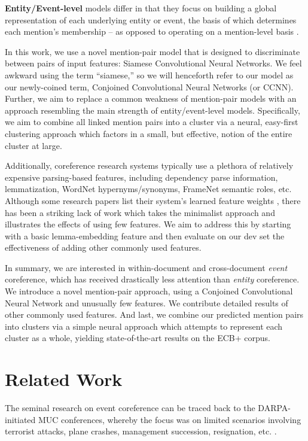 \documentclass[11pt,a4paper]{article}
\begin{document}
\textbf{Entity/Event-level} models differ in that they focus on building a global representation of each underlying entity or event, the basis of which determines each mention's membership -- as opposed to operating on a mention-level basis \cite{DBLP:journals/corr/WisemanRS16,clark2016improving}.

In this work, we use a novel mention-pair model that is designed to discriminate between pairs of input features: Siamese Convolutional Neural Networks.  We feel awkward using the term ``siamese,'' so we will henceforth refer to our model as our newly-coined term, Conjoined Convolutional Neural Networks (or CCNN).  Further, we aim to replace a common weakness of mention-pair models with an approach resembling the main strength of entity/event-level models. Specifically, we aim to combine all linked mention pairs into a cluster via a neural, easy-first clustering approach which factors in a small, but effective, notion of the entire cluster at large.

Additionally, coreference research systems typically use a plethora of relatively expensive parsing-based features, including dependency parse information, lemmatization, WordNet hypernyms/synonyms, FrameNet semantic roles, etc.  Although some research papers list their system's learned feature weights \cite{journals/tacl/YangCF15}, there has been a striking lack of work which takes the minimalist approach and illustrates the effects of using few features.  We aim to address this by starting with a basic lemma-embedding feature and then evaluate on our dev set the effectiveness of adding other commonly used features.

In summary, we are interested in within-document and cross-document \textit{event} coreference, which has received drastically less attention than \textit{entity} coreference. We introduce a novel mention-pair approach, using a Conjoined Convolutional Neural Network and unusually few features.  We contribute detailed results of other commonly used features.  And last, we combine our predicted mention pairs into clusters via a simple neural approach which attempts to represent each cluster as a whole, yielding state-of-the-art results on the ECB+ corpus.


\section{Related Work}
The seminal research on event coreference can be traced back to the DARPA-initiated MUC conferences, whereby the focus was on limited scenarios involving terrorist attacks, plane crashes, management succession, resignation, etc. \cite{Humphreys:1997,Bagga:1999:CEC:1608810.1608812}.
\end{document}
